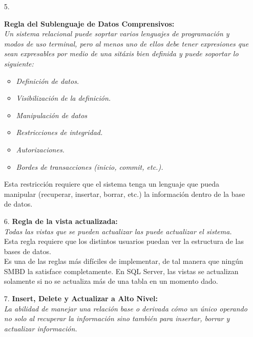 \documentclass[a4paper, 12pt]{report}
\begin{document}
{\begin{enumerate}
{    \textit{En el nivel lógico, la descripción de la base de datos está
    representada al mismo nivel que los datos ordinarios. De esta manera, los
    usuarios autorizados pueden usar el mismo lenguaje relacional que se usa
    para datos regulares.}\\
    En general requiere que el sistema sea autodescriptivo.
}
\item[5.]{\textbf{Regla del Sublenguaje de Datos Comprensivos:}\\
    \textit{
    Un sistema relacional puede soprtar varios lenguajes de programación y modos
    de uso terminal, pero al menos uno de ellos debe tener expresiones que sean
    expresables por medio de una sitáxis bien definida y puede soportar lo
    siguiente:}
    \begin{itemize}
        \item\textit{{Definición de datos.}}
        \item\textit{{Visibilización de la definición.}}
        \item\textit{{Manipulación de datos}}
        \item\textit{{Restricciones de integridad.}}
        \item\textit{{Autorizaciones.}}
        \item\textit{{Bordes de transacciones (inicio, commit, etc.).}}
    \end{itemize}
    Esta restricción requiere que el sistema tenga un lenguaje que pueda manipular
    (recuperar, insertar, borrar, etc.) la información dentro de la base de datos.
}
\item[6.]{\textbf{Regla de la vista actualizada:}\\
    \textit{Todas las vistas que se pueden actualizar las puede actualizar el
    sistema.}\\
    Esta regla requiere que los distintos usuarios puedan ver la estructura de
    las bases de datos.\\
    Es una de las reglas más difíciles de implementar, de tal manera que ningún
    SMBD la satisface completamente. En SQL Server, las vistas se actualizan
    solamente si no se actualiza más de una tabla en un momento dado.
}
\item[7.]{\textbf{Insert, Delete y Actualizar a Alto Nivel:}\\
    \textit{La abilidad de manejar una relación base o derivada cómo un único
    operando no solo al recuperar la información sino también para insertar,
    borrar y actualizar información.}\\
}
\end{enumerate}}
\end{document}
